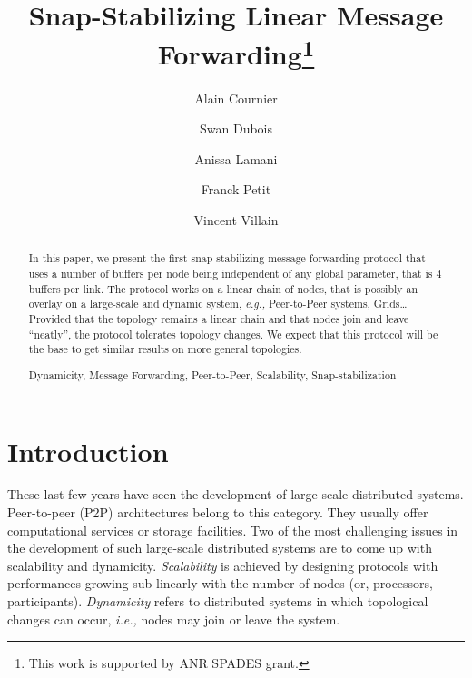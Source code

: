 \documentclass{llncs}
\newcommand{\keywords}[1]{\par\addvspace\baselineskip
\noindent\keywordname\enspace\ignorespaces#1}
\newcommand{\eg}{\emph{e.g., }}
\newcommand{\ie}{\emph{i.e., }}
\begin{document}
\frontmatter          \pagestyle{headings}   

\mainmatter              \title{Snap-Stabilizing Linear Message Forwarding\thanks{This work is supported by ANR SPADES grant.}
}

\author{
  Alain Cournier \and  
  Swan Dubois \and 
  Anissa Lamani \and 
  Franck Petit \and 
  Vincent Villain 
}

   

\maketitle
\begin {abstract}

In this paper, we present the first snap-stabilizing message forwarding protocol that uses 
a number of buffers per node being independent of any global parameter, that is $4$ buffers per 
link.  The protocol works on a linear chain of nodes, that is possibly an overlay on a large-scale and dynamic system,
\eg Peer-to-Peer systems, Grids\ldots  
Provided that the topology remains a linear chain and that nodes join and leave 
``neatly'', the protocol tolerates topology changes.  
We expect that this protocol will be the base to get similar results on more general topologies. 


\keywords {Dynamicity, Message Forwarding, Peer-to-Peer, Scalability, Snap-stabilization} 
\end {abstract}



\section{Introduction}

These last few years have seen the development of large-scale distributed systems.  
Peer-to-peer (P2P) architectures belong to this category.  They usually offer computational services or storage facilities.
Two of the most challenging issues in the development of such large-scale distributed 
systems are to come up with scalability and dynamicity.  {\em Scalability} is achieved by designing protocols 
with performances growing sub-linearly with the number of nodes (or, processors, participants).  {\em Dynamicity} refers to 
distributed systems in which topological changes can occur, \ie nodes may join or leave the system.
\end{document}

